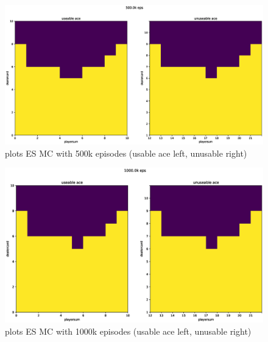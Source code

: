 \documentclass[11pt,a4paper]{article}
\begin{document}
\begin{figure}[h!]
  \includegraphics[width=.7\textwidth]{500k.eps}
  \centering
  \caption{plots ES MC with 500k episodes (usable ace left, unusable right)}
  \label{fig8}
\end{figure}

\begin{figure}[h!]
  \includegraphics[width=.7\textwidth]{1000k.eps}
  \centering
  \caption{plots ES MC with 1000k episodes (usable ace left, unusable right)}
  \label{fig9}
\end{figure}
\end{document}
